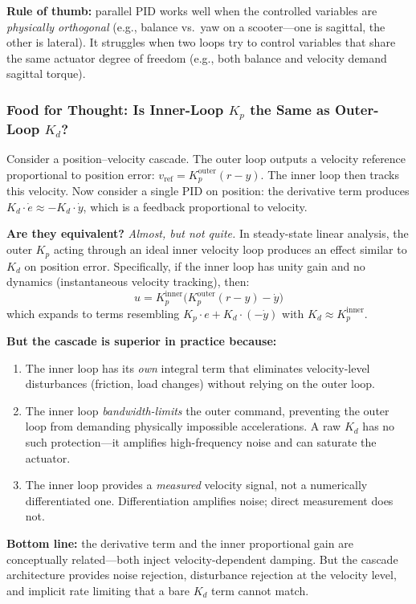 \textbf{Rule of thumb:} parallel PID works well when the controlled variables are \textit{physically orthogonal} (e.g., balance vs.\ yaw on a scooter---one is sagittal, the other is lateral). It struggles when two loops try to control variables that share the same actuator degree of freedom (e.g., both balance and velocity demand sagittal torque).

\subsubsection{Food for Thought: Is Inner-Loop $K_p$ the Same as Outer-Loop $K_d$?}

Consider a position--velocity cascade. The outer loop outputs a velocity reference proportional to position error: $v_{\text{ref}} = K_p^{\text{outer}} (r - y)$. The inner loop then tracks this velocity. Now consider a single PID on position: the derivative term produces $K_d \cdot \dot{e} \approx -K_d \cdot \dot{y}$, which is a feedback proportional to velocity.

\textbf{Are they equivalent?} \textit{Almost, but not quite.} In steady-state linear analysis, the outer $K_p$ acting through an ideal inner velocity loop produces an effect similar to $K_d$ on position error. Specifically, if the inner loop has unity gain and no dynamics (instantaneous velocity tracking), then:
\[
u = K_p^{\text{inner}} \bigl(K_p^{\text{outer}}(r-y) - \dot{y}\bigr)
\]
which expands to terms resembling $K_p \cdot e + K_d \cdot (-\dot{y})$ with $K_d \approx K_p^{\text{inner}}$.

\textbf{But the cascade is superior in practice because:}
\begin{enumerate}[nosep]
    \item The inner loop has its \textit{own} integral term that eliminates velocity-level disturbances (friction, load changes) without relying on the outer loop.
    \item The inner loop \textit{bandwidth-limits} the outer command, preventing the outer loop from demanding physically impossible accelerations. A raw $K_d$ has no such protection---it amplifies high-frequency noise and can saturate the actuator.
    \item The inner loop provides a \textit{measured} velocity signal, not a numerically differentiated one. Differentiation amplifies noise; direct measurement does not.
\end{enumerate}

\textbf{Bottom line:} the derivative term and the inner proportional gain are conceptually related---both inject velocity-dependent damping. But the cascade architecture provides noise rejection, disturbance rejection at the velocity level, and implicit rate limiting that a bare $K_d$ term cannot match.
